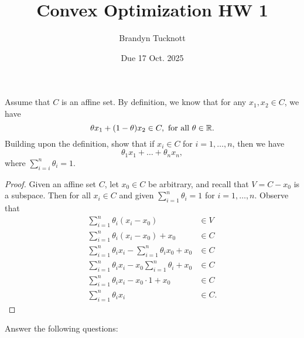 \documentclass{exam}
\title{Convex Optimization HW 1}
\author{Brandyn Tucknott}
\date{Due 17 Oct. 2025}
\begin{document}
\maketitle

\begin{questions}
    \question Assume that $C$ is an affine set. By definition, we know that for any $x_1,x_2\in C$, we have
    $$\theta x_1 + (1 - \theta)x_2 \in C, \text{ for all } \theta\in\mathbb {R}.$$
    Building upon the definition, show that if $x_i\in C$ for $i = 1, \hdots, n$, then we have
    $$\theta_1 x_1 + \hdots + \theta_n x_n,$$
    where $\sum_{i = i}^n \theta_i = 1.$
    \begin{proof}
        Given an affine set $C$, let $x_0\in C$ be arbitrary, and recall that $V = C - x_0$ is a subspace. Then for all $x_i\in C$
        and given $\sum_{i = 1}^n \theta_i = 1$ for $i = 1, \hdots, n$. Observe that
        \begin{align*}
            \sum_{i = 1}^n \theta_i(x_i - x_0) &\in V \\
            \sum_{i = 1}^n \theta_i(x_i - x_0) + x_0&\in C \\
            \sum_{i = 1}^n \theta_ix_i - \sum_{i = 1}^n \theta_ix_0 + x_0 &\in C \\
            \sum_{i = 1}^n \theta_ix_i - x_0\sum_{i = 1}^n \theta_i + x_0 &\in C \\
            \sum_{i = 1}^n \theta_ix_i - x_0\cdot 1 + x_0 &\in C \\
            \sum_{i = 1}^n \theta_ix_i &\in C.
        \end{align*}
    \end{proof}


    \newpage
    \question Answer the following questions:
    \begin{parts}

\end{parts}
\end{questions}
\end{document}
